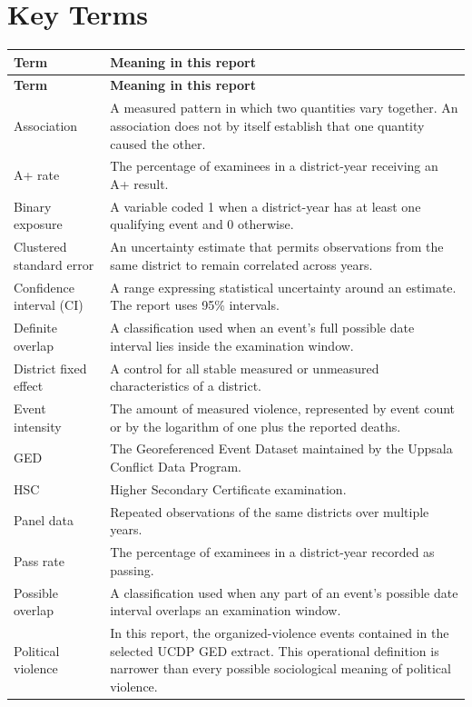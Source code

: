 \documentclass[11pt]{article}
\begin{document}
\clearpage
\tableofcontents
\listoftables
\listoffigures
\clearpage

\section{Key Terms}

\begin{longtable}{p{}p{}}
\toprule
\textbf{Term} & \textbf{Meaning in this report} \\
\midrule
\endfirsthead
\toprule
\textbf{Term} & \textbf{Meaning in this report} \\
\midrule
\endhead
Association & A measured pattern in which two quantities vary together. An association does not by itself establish that one quantity caused the other. \\
A+ rate & The percentage of examinees in a district-year receiving an A+ result. \\
Binary exposure & A variable coded 1 when a district-year has at least one qualifying event and 0 otherwise. \\
Clustered standard error & An uncertainty estimate that permits observations from the same district to remain correlated across years. \\
Confidence interval (CI) & A range expressing statistical uncertainty around an estimate. The report uses 95\% intervals. \\
Definite overlap & A classification used when an event's full possible date interval lies inside the examination window. \\
District fixed effect & A control for all stable measured or unmeasured characteristics of a district. \\
Event intensity & The amount of measured violence, represented by event count or by the logarithm of one plus the reported deaths. \\
GED & The Georeferenced Event Dataset maintained by the Uppsala Conflict Data Program. \\
HSC & Higher Secondary Certificate examination. \\
Panel data & Repeated observations of the same districts over multiple years. \\
Pass rate & The percentage of examinees in a district-year recorded as passing. \\
Possible overlap & A classification used when any part of an event's possible date interval overlaps an examination window. \\
Political violence & In this report, the organized-violence events contained in the selected UCDP GED extract. This operational definition is narrower than every possible sociological meaning of political violence. \\

\end{longtable}
\end{document}
